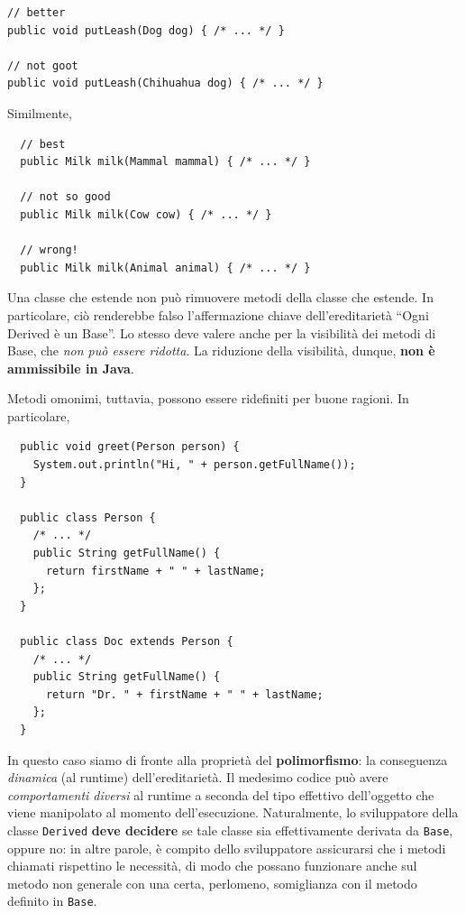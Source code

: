 \documentclass[\fontsizeclass,twocolumn]{\classname}
\theoremstyle{definition}
\theoremstyle{definition}
\begin{document}
\begin{lstlisting}
// better
public void putLeash(Dog dog) { /* ... */ }

// not goot 
public void putLeash(Chihuahua dog) { /* ... */ }
\end{lstlisting}

Similmente,

\begin{lstlisting}
  // best
  public Milk milk(Mammal mammal) { /* ... */ }
  
  // not so good
  public Milk milk(Cow cow) { /* ... */ }
  
  // wrong!
  public Milk milk(Animal animal) { /* ... */ }
\end{lstlisting}

Una classe che estende non può rimuovere metodi della classe che estende. In
particolare, ciò renderebbe falso l'affermazione chiave dell'ereditarietà ``Ogni
Derived è un Base''. Lo stesso deve valere anche per la visibilità dei metodi di
Base, che \emph{non può essere ridotta}. La riduzione della visibilità, dunque,
\textbf{non è ammissibile in Java}.

Metodi omonimi, tuttavia, possono essere ridefiniti per buone ragioni. In
particolare,

\begin{lstlisting}
  public void greet(Person person) {
    System.out.println("Hi, " + person.getFullName());
  }

  public class Person {
    /* ... */
    public String getFullName() {
      return firstName + " " + lastName;
    };
  }

  public class Doc extends Person {
    /* ... */
    public String getFullName() {
      return "Dr. " + firstName + " " + lastName;
    };
  }
\end{lstlisting}

In questo caso siamo di fronte alla proprietà del \textbf{polimorfismo}: la
conseguenza \emph{dinamica} (al runtime) dell'ereditarietà. Il medesimo codice
può avere \emph{comportamenti diversi} al runtime a seconda del tipo effettivo
dell'oggetto che viene manipolato al momento dell'esecuzione. Naturalmente, lo
sviluppatore della classe \texttt{Derived} \textbf{deve decidere} se tale classe sia
effettivamente derivata da \texttt{Base}, oppure no: in altre parole, è compito dello
sviluppatore assicurarsi che i metodi chiamati rispettino le necessità, di modo
che possano funzionare anche sul metodo non generale con una certa, perlomeno,
somiglianza con il metodo definito in \texttt{Base}.
\end{document}
